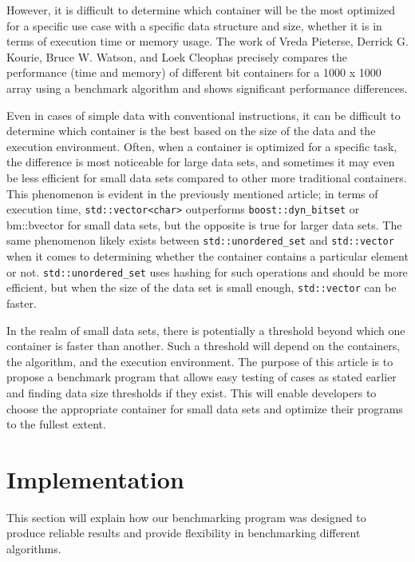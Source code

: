 \documentclass[conference]{IEEEtran} \IEEEoverridecommandlockouts
\def\code#1{\texttt{#1}}
\begin{document}
However, it is difficult to determine which container will be the most
optimized for a specific use case with a specific data structure and
size, whether it is in terms of execution time or memory usage. The
work of Vreda Pieterse, Derrick G. Kourie, Bruce W. Watson, and Loek
Cleophas \cite{https://doi.org/10.1145/1899503.1899530} precisely
compares the performance (time and memory) of different bit containers
for a 1000 x 1000 array using a benchmark algorithm and shows
significant performance differences.

Even in cases of simple data with conventional instructions, it can be
difficult to determine which container is the best based on the size
of the data and the execution environment. Often, when a container is
optimized for a specific task, the difference is most noticeable for
large data sets, and sometimes it may even be less efficient for small
data sets compared to other more traditional containers. This
phenomenon is evident in the previously mentioned
article\cite{https://doi.org/10.1145/1899503.1899530}; in terms of
execution time, \code{std::vector<char>} outperforms
\code{boost::dyn\_bitset} or bm::bvector for small data sets, but the
opposite is true for larger data sets. The same phenomenon likely
exists between \code{std::unordered\_set} and \code{std::vector} when
it comes to determining whether the container contains a particular
element or not. \code{std::unordered\_set} uses hashing for such
operations and should be more efficient, but when the size of the data
set is small enough, \code{std::vector} can be faster.

In the realm of small data sets, there is potentially a threshold
beyond which one container is faster than another. Such a threshold
will depend on the containers, the algorithm, and the execution
environment. The purpose of this article is to propose a benchmark
program that allows easy testing of cases as stated earlier and
finding data size thresholds if they exist. This will enable
developers to choose the appropriate container for small data sets and
optimize their programs to the fullest extent.

\section{Implementation}

This section will explain how our benchmarking program was designed to
produce reliable results and provide flexibility in benchmarking
different algorithms.
\end{document}
